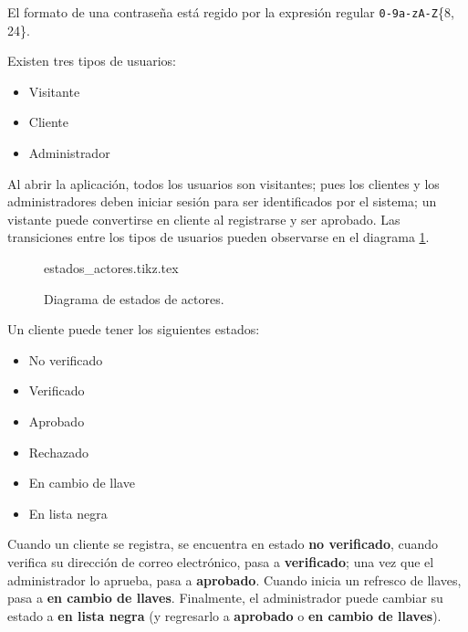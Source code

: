 
{
  El formato de una contraseña está regido por la expresión regular
  \texttt{0-9a-zA-Z}\{8, 24\}.
}

{
  Existen tres tipos de usuarios:
  \begin{itemize}
    \item Visitante
    \item Cliente
    \item Administrador
  \end{itemize}

  Al abrir la aplicación, todos los usuarios son visitantes; pues los clientes
  y los administradores deben iniciar sesión para ser identificados por el
  sistema; un vistante puede convertirse en cliente al registrarse y ser
  aprobado. Las transiciones entre los tipos de usuarios pueden observarse en el
  diagrama \ref{estados_actores}.
}

\begin{figure}
  \begin{center}
    {estados_actores.tikz.tex}
    \caption{Diagrama de estados de actores.}
    \label{estados_actores}
  \end{center}
\end{figure}

{
  Un cliente puede tener los siguientes estados:
  \begin{itemize}
    \item No verificado
    \item Verificado
    \item Aprobado
    \item Rechazado
    \item En cambio de llave
    \item En lista negra
  \end{itemize}

  Cuando un cliente se registra, se encuentra en estado \textbf{no verificado},
  cuando verifica su dirección de correo electrónico, pasa a
  \textbf{verificado}; una vez que el administrador lo aprueba, pasa a
  \textbf{aprobado}. Cuando inicia un refresco de llaves, pasa a
  \textbf{en cambio de llaves}. Finalmente, el administrador puede cambiar su
  estado a \textbf{en lista negra} (y regresarlo a \textbf{aprobado} o
  \textbf{en cambio de llaves}).
}

